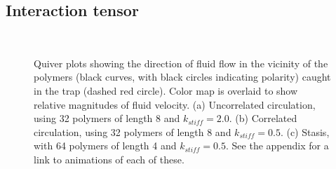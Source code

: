 \documentclass[11pt]{ucthesis}
\begin{document}
\subsection{Interaction tensor}

\begin{figure}
\centering
{}
\ \\
\caption{Quiver plots showing the direction of fluid flow in the vicinity of the polymers (black curves, with black circles indicating polarity) caught in the trap (dashed red circle). Color map is overlaid to show relative magnitudes of fluid velocity. (a) Uncorrelated circulation, using 32 polymers of length 8 and $k_{stiff}=2.0$. (b) Correlated circulation, using 32 polymers of length 8 and $k_{stiff}=0.5$. (c) Stasis, with 64 polymers of length 4 and $k_{stiff}=0.5$. See the appendix for a link to animations of each of these.\label{fig:quiver}}
\end{figure}
\end{document}

